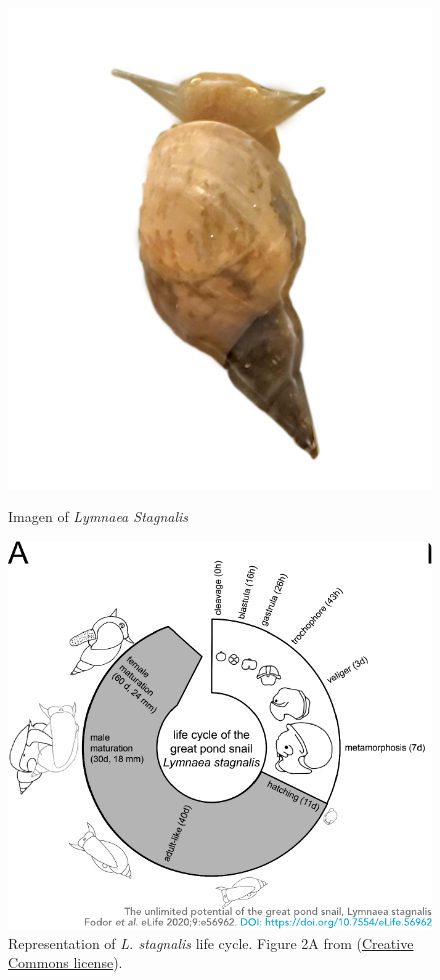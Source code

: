 \begin{figure}[htb!]
	\begin{minipage}{0.35\textwidth}
	\centering
	\includegraphics[width=\linewidth]{img/intro/lymnaea.png} 
	\caption{Imagen of \textit{Lymnaea Stagnalis}}
	\label{fig:snail}
	\end{minipage}
	\hfill
	\begin{minipage}{0.65\textwidth}
		\centering
		\includegraphics[width=\textwidth]{img/intro/lymnaea_life_cycle.pdf}
		\caption{Representation of \textit{L. stagnalis} life cycle. Figure 2A from \cite{fodor_unlimited_2020} (\href{http://creativecommons.org/licenses/by/4.0/}{Creative Commons license}).}
		\label{fig:lymnaea_life_cycle}
	\end{minipage}
\end{figure}

